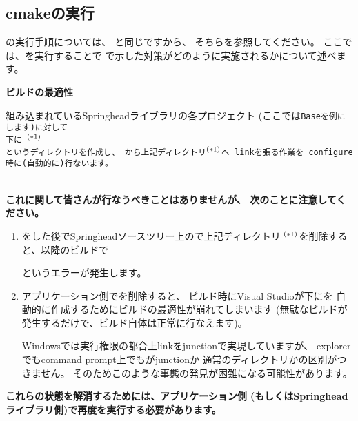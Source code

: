 \subsection{cmakeの実行}
\label{subsec:CmakeApplication}

\noindent
\cmake の実行手順については、
と同じですから、
そちらを参照してください。
ここでは、\cmake を実行することで
で示した対策がどのように実施されるかについて述べます。

\bigskip
\noindent
\bf{ビルドの最適性}
\begin{narrow}[20pt]
	組み込まれているSpringheadライブラリの各プロジェクト
	(ここでは\tt{Base}を例にします)に対して\\
	\hspace{20pt}下に
	$^{\small (*1)}$\\
	というディレクトリを作成し、
	から上記ディレクトリ$^{\small (*1)}$へ
	linkを張る作業を\cmake\ configure時に(自動的に)行ないます。
\end{narrow}	
\begin{narrow}[20pt]
	\thinrule{\linewidth}\\
	{\bf{これに関して皆さんが行なうべきことはありませんが、
	次のことに注意してください。}}

	\medskip
	\begin{enumerate}
	  \item	\cmake をした後でSpringheadソースツリー上ので上記ディレクトリ
		$^{\small (*1)}$を削除すると、以降のビルドで\\
		\hspace{15pt}

		というエラーが発生します。

	  \item	アプリケーション側でを削除すると、
		ビルド時にVisual Studioが\build 下にを
		自動的に作成するためにビルドの最適性が崩れてしまいます
		(無駄なビルドが発生するだけで、ビルド自体は正常に行なえます)。
		\begin{narrow}[s][15pt]
		Windowsでは実行権限の都合上linkをjunctionで実現していますが、
		explorerでもcommand prompt上でもがjunctionか
		通常のディレクトリかの区別がつきません。
		そのためこのような事態の発見が困難になる可能性があります。
		\end{narrow}
	\end{enumerate}
	\medskip
	{\bf{これらの状態を解消するためには、アプリケーション側
	(もしくはSpringheadライブラリ側)で再度\cmake を実行する必要があります。}}

	\thinrule{\linewidth}
\end{narrow}

